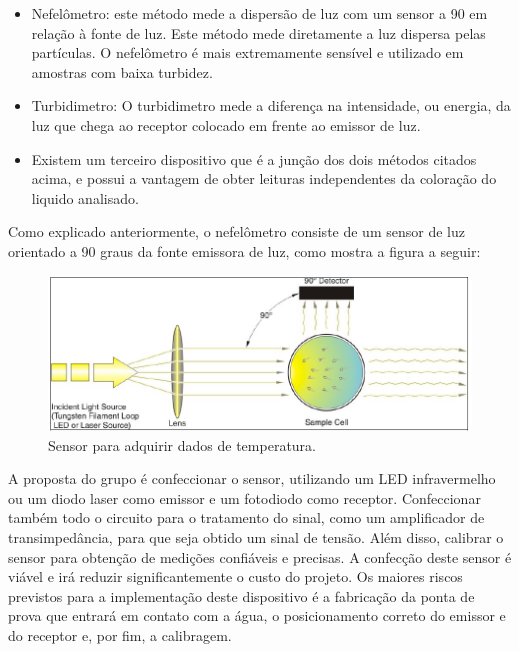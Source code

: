\begin{itemize}
    \item Nefelômetro: este método mede a dispersão de luz com um sensor a 90 em relação à fonte de luz. Este método mede diretamente a luz dispersa pelas partículas. O nefelômetro é mais extremamente sensível e utilizado em amostras com baixa turbidez.
    
    \item Turbidimetro: O turbidimetro mede a diferença na intensidade, ou energia, da luz que chega ao receptor colocado em frente ao emissor de luz.
    \item Existem um terceiro dispositivo que é a junção dos dois métodos citados acima, e possui a vantagem de obter leituras independentes da coloração do liquido analisado.

 
\end{itemize}

Como explicado anteriormente, o nefelômetro consiste de um sensor de luz orientado a 90 graus da fonte emissora de luz, como mostra a figura a seguir:
\FloatBarrier
 \begin{figure} [!htp]
	\centering
	\includegraphics[scale=0.5]{figuras/sensorturbidez}
	\caption{Sensor para adquirir dados de temperatura.}
	\label{sensorturbidez}
\end{figure}
\FloatBarrier

A proposta do grupo é confeccionar o sensor, utilizando um LED infravermelho ou um diodo laser como emissor e um fotodiodo como receptor. Confeccionar também todo o circuito para o tratamento do sinal, como um amplificador de transimpedância, para que seja obtido um sinal de tensão. Além disso, calibrar o sensor para obtenção de medições confiáveis e precisas. A confecção deste sensor é viável e irá reduzir significantemente o custo do projeto.
Os maiores riscos previstos para a implementação deste dispositivo é a fabricação da ponta de prova que entrará em contato com a água, o posicionamento correto do emissor e do receptor e, por fim, a calibragem. 


